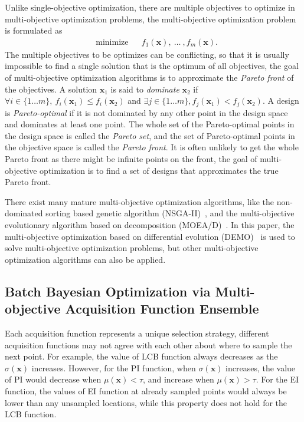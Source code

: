 Unlike single-objective optimization, there are multiple objectives to optimize in multi-objective optimization problems\cite{MO_overview}, the multi-objective optimization problem is formulated as
\begin{equation}
    \label{eq:MOFormulation}
    \begin{aligned}
        & \text{minimize} & & f_1(\bm{x}),~\dots~,f_m(\bm{x}).
    \end{aligned}
\end{equation}
The multiple objectives to be optimizes can be conflicting, so that it is usually impossible to find a single solution that is the optimum of all objectives, the goal of multi-objective optimization algorithms is to approximate the \emph{Pareto front} of the objectives. A solution $\bm{x}_1$ is said to \emph{dominate} $\bm{x}_2$ if $\forall i \in \{1\dots m\},~f_i(\bm{x}_1) \le f_i(\bm{x}_2)$ and $\exists j \in \{1\dots m\}, f_j(\bm{x}_1) < f_j(\bm{x}_2)$. A design is \emph{Pareto-optimal} if it is not dominated by any other point in the design space and dominates at least one point. The whole set of the Pareto-optimal points in the design space is called the \emph{Pareto set}, and the set of Pareto-optimal points in the objective space is called the \emph{Pareto front}. It is often unlikely to get the whole Pareto front as there might be infinite points on the front, the goal of multi-objective optimization is to find a set of designs that approximates the true Pareto front.

There exist many mature multi-objective optimization algorithms, like the non-dominated sorting based genetic algorithm (NSGA-II)~\cite{nsgaii}, and the multi-objective evolutionary algorithm based on decomposition (MOEA/D)~\cite{moead}. In this paper, the multi-objective optimization based on differential evolution (DEMO)~\cite{demo} is used to solve multi-objective optimization problems, but other multi-objective optimization algorithms can also be applied.

\subsection{Batch Bayesian Optimization via Multi-objective Acquisition Function Ensemble}

Each acquisition function represents a unique selection strategy, different acquisition functions may not agree with each other about where to sample the next point. For example, the value of LCB function always decreases as the $\sigma(\bm{x})$ increases. However, for the PI function, when $\sigma(\bm{x})$ increases, the value of PI would decrease when $\mu(\bm{x}) < \tau$, and increase when $\mu(\bm{x}) > \tau$. For the EI function, the values of EI function at already sampled points would always be lower than any unsampled locations, while this property does not hold for the LCB function.


